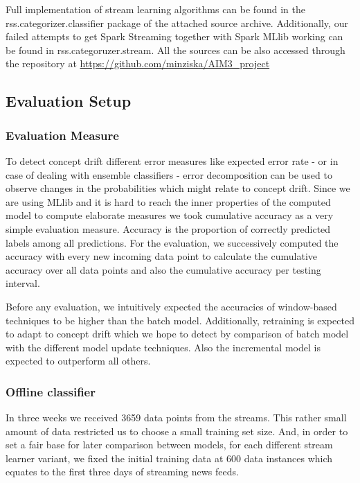 \documentclass{article} %
\begin{document}
Full implementation of stream learning algorithms can be found in the rss.categorizer.classifier package of the attached source archive. Additionally, our failed attempts to get Spark Streaming together with Spark MLlib working can be found in rss.categoruzer.stream. All the sources can be also accessed through the repository at \url{https://github.com/minziska/AIM3_project}

\subsection{Evaluation Setup}


\subsubsection*{Evaluation Measure}

To detect concept drift different error measures like expected error rate - or in case of dealing with ensemble classifiers - error decomposition can be used to observe changes in the probabilities which might relate to concept drift.\cite{Gao07ageneral}  Since we are using MLlib and it is hard to reach the inner properties of the computed model to compute elaborate measures we took cumulative accuracy as a very simple evaluation measure.  Accuracy is the  proportion of correctly predicted labels among all predictions. For the evaluation, we successively computed the accuracy with every new incoming data point to calculate the cumulative accuracy over all data points and also the cumulative accuracy per testing interval.

Before any evaluation, we intuitively expected the accuracies of window-based techniques to be higher than the batch model. Additionally, retraining is expected to adapt to concept drift which we hope to detect by comparison of batch model with the different model update techniques. Also the incremental model is expected to outperform all others.

\subsubsection*{Offline classifier}
In three weeks we received 3659 data points from the streams. This rather small amount of data restricted us to choose a small training set size. And, in order to set a fair base for later comparison between models, for each different stream learner variant, we fixed the initial training data at 600 data instances which equates to the first three days of streaming news feeds. 
\end{document}
